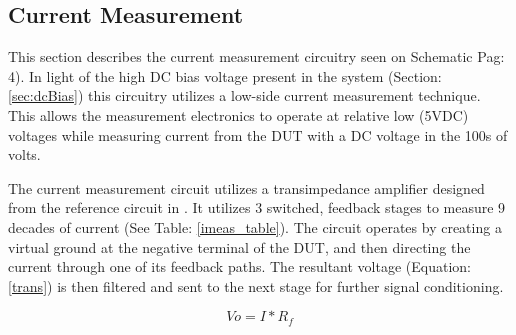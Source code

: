 \subsection{Current Measurement}
\label{sec:iMeas}

This section describes the current measurement circuitry seen on Schematic Pag: 4). In light of the high DC bias voltage present in the system (Section: \ref{sec:dcBias}) this circuitry utilizes a low-side current measurement technique. This allows the measurement electronics to operate at relative low (5VDC) voltages while measuring current from the DUT with a DC voltage in the 100s of volts.



The current measurement circuit utilizes a transimpedance amplifier designed from the reference circuit in \cite{steve_thesis}. It utilizes 3 switched, feedback stages to measure 9 decades of current (See Table: \ref{imeas_table}). The circuit operates by creating a virtual ground at the negative terminal of the DUT, and then directing the current through one of its feedback paths. The resultant voltage (Equation: \eqref{trans}) is then filtered and sent to the next stage for further signal conditioning.

\begin{equation}
\label{trans}
Vo = I*R_f
\end{equation}

